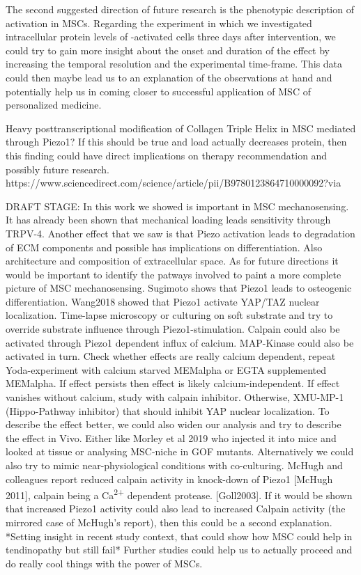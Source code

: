 The second suggested direction of future research is the phenotypic description of \Piezo{} activation in MSCs. Regarding the experiment in which we investigated intracellular protein levels of \Piezo{}-activated cells three days after intervention, we could try to gain more insight about the onset and duration of the effect by increasing the temporal resolution and the experimental time-frame. This data could then maybe lead us to an explanation of the observations at hand and potentially help us in coming closer to successful application of MSC of personalized medicine.

Heavy posttranscriptional modification of Collagen Triple Helix in MSC mediated through Piezo1? If this should be true and load actually decreases protein, then this finding could have direct implications on therapy recommendation and possibly future research. https://www.sciencedirect.com/science/article/pii/B9780123864710000092?via%


DRAFT STAGE: 
In this work we showed \Piezo{} is important in MSC mechanosensing. It has already been shown that mechanical loading leads sensitivity through TRPV-4.  Another effect that we saw is that Piezo activation leads to degradation of ECM components and possible has implications on differentiation. Also architecture and composition of extracellular space.
As for future directions it would be important to identify the patways involved to paint a more complete picture of MSC mechanosensing. Sugimoto shows that Piezo1 leads to osteogenic differentiation. Wang2018 showed that Piezo1 activate YAP/TAZ nuclear localization. Time-lapse microscopy or culturing on soft substrate and try to override substrate influence through Piezo1-stimulation. Calpain could also be activated through Piezo1 dependent influx of calcium. MAP-Kinase could also be activated in turn.  Check whether effects are really calcium dependent, repeat Yoda-experiment with calcium starved MEMalpha or EGTA supplemented MEMalpha. If effect persists then effect is likely calcium-independent. If effect vanishes without calcium, study with calpain inhibitor. Otherwise, XMU-MP-1 (Hippo-Pathway inhibitor) that should inhibit YAP nuclear localization. To describe the effect better, we could also widen our analysis and try to describe the effect in Vivo. Either like Morley et al 2019 who injected it into mice and looked at tissue or analysing MSC-niche in GOF mutants. Alternatively we could also try to mimic near-physiological conditions with co-culturing.
McHugh and colleagues report reduced calpain activity in knock-down of Piezo1 [McHugh 2011], calpain being a Ca\textsuperscript{2+} dependent protease. [Goll2003]. If it would be shown that increased Piezo1 activity could also lead to increased Calpain activity (the mirrored case of McHugh's report), then this could be a second explanation.
*Setting insight in recent study context, that could show how MSC could help in tendinopathy but still fail* Further studies could help us to actually proceed and do really cool things with the power of MSCs. 